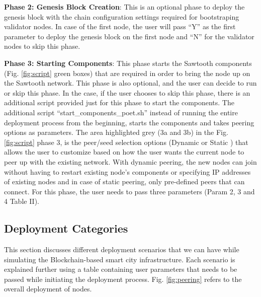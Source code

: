 \textbf{Phase 2: Genesis Block Creation}: This is an optional phase to deploy the genesis block with the chain configuration settings required for bootstraping validator nodes. In case of the first node, the user will pass ``Y'' as the first parameter to deploy the genesis block on the first node and ``N'' for the validator nodes to skip this phase.

\textbf{Phase 3: Starting Components}: This phase starts the Sawtooth components (Fig. \ref{fig:script} green boxes) that are required in order to bring the node up on the Sawtooth network. This phase is also optional, and the user can decide to run or skip this phase. In the case, if the user chooses to skip this phase, there is an additional script provided just for this phase to start the components. The additional script ``start\_components\_poet.sh'' instead of running the entire deployment process from the beginning, starts the components and takes peering options as parameters. The area highlighted grey (3a and 3b) in the Fig. \ref{fig:script} phase 3, is the peer/seed selection options (Dynamic or Static \cite{sawtooth-peering}) that allows the user to customize based on how the user wants the current node to peer up with the existing network. With dynamic peering, the new nodes can join without having to restart existing node's components or specifying IP addresses of existing nodes and in case of static peering, only pre-defined peers that can connect. For this phase, the user needs to pass three parameters (Param 2, 3 and 4 Table II).

\subsection{Deployment Categories}
This section discusses different deployment scenarios that we can have while simulating the Blockchain-based smart city infrastructure. Each scenario is explained further using a table containing user parameters that needs to be passed while initiating the deployment process. Fig. \ref{fig:peering} refers to the overall deployment of nodes.

